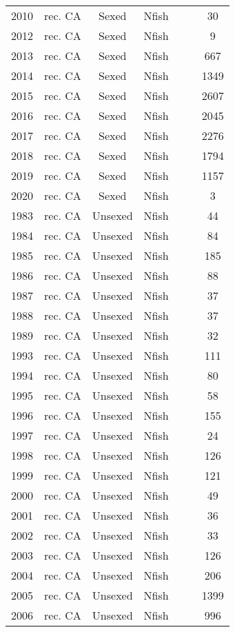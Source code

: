 \begin{longtable}[t]{c>{\centering\arraybackslash}p{3cm}ccccc}
2010 & rec. CA & Sexed & Nfish &  &  & 30\\
2012 & rec. CA & Sexed & Nfish &  &  & 9\\
2013 & rec. CA & Sexed & Nfish &  &  & 667\\
2014 & rec. CA & Sexed & Nfish &  &  & 1349\\
2015 & rec. CA & Sexed & Nfish &  &  & 2607\\
2016 & rec. CA & Sexed & Nfish &  &  & 2045\\
2017 & rec. CA & Sexed & Nfish &  &  & 2276\\
2018 & rec. CA & Sexed & Nfish &  &  & 1794\\
2019 & rec. CA & Sexed & Nfish &  &  & 1157\\
2020 & rec. CA & Sexed & Nfish &  &  & 3\\
1983 & rec. CA & Unsexed & Nfish &  &  & 44\\
1984 & rec. CA & Unsexed & Nfish &  &  & 84\\
1985 & rec. CA & Unsexed & Nfish &  &  & 185\\
1986 & rec. CA & Unsexed & Nfish &  &  & 88\\
1987 & rec. CA & Unsexed & Nfish &  &  & 37\\
1988 & rec. CA & Unsexed & Nfish &  &  & 37\\
1989 & rec. CA & Unsexed & Nfish &  &  & 32\\
1993 & rec. CA & Unsexed & Nfish &  &  & 111\\
1994 & rec. CA & Unsexed & Nfish &  &  & 80\\
1995 & rec. CA & Unsexed & Nfish &  &  & 58\\
1996 & rec. CA & Unsexed & Nfish &  &  & 155\\
1997 & rec. CA & Unsexed & Nfish &  &  & 24\\
1998 & rec. CA & Unsexed & Nfish &  &  & 126\\
1999 & rec. CA & Unsexed & Nfish &  &  & 121\\
2000 & rec. CA & Unsexed & Nfish &  &  & 49\\
2001 & rec. CA & Unsexed & Nfish &  &  & 36\\
2002 & rec. CA & Unsexed & Nfish &  &  & 33\\
2003 & rec. CA & Unsexed & Nfish &  &  & 126\\
2004 & rec. CA & Unsexed & Nfish &  &  & 206\\
2005 & rec. CA & Unsexed & Nfish &  &  & 1399\\
2006 & rec. CA & Unsexed & Nfish &  &  & 996\\

\end{longtable}
